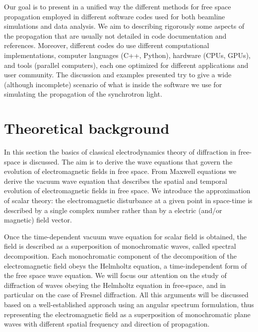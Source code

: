 \documentclass{iucr}              %
\begin{document}
Our goal is to present in a unified way the different methods for free space propagation employed in different software codes used for both beamline simulations and data analysis. We aim to describing rigorously some aspects of the propagation that are usually not detailed in code documentation and references. Moreover, different codes do use different computational implementations, computer languages (C++, Python), hardware (CPUs, GPUs), and tools (parallel computers), each one optimized for different applications and user community. The discussion and examples presented try to give a wide (although incomplete) scenario of what is inside the software we use for simulating the propagation of the synchrotron light.   

%

\section{Theoretical background}
\label{ch: theory}

In this section the basics of classical electrodynamics theory of diffraction in free-space is discussed. The aim is to derive the wave equations that govern the evolution of electromagnetic fields in free space. From Maxwell equations we derive the vacuum wave equation that describes the spatial and temporal evolution of electromagnetic fields in free space. We introduce the approximation of scalar theory: the electromagnetic disturbance at a given point in space-time is described by a single complex number rather than by a electric (and/or magnetic) field vector.

Once the time-dependent vacuum wave equation for scalar field is obtained, the field is described as a superposition of monochromatic waves, called spectral decomposition. Each monochromatic component of the decomposition of the electromagnetic field obeys the Helmholtz equation, a time-independent form of the free space wave equation. We will focus our attention on the study of diffraction of waves obeying the Helmholtz equation in free-space, and in particular on the case of Fresnel diffraction. All this arguments will be discussed based on a well-established approach \cite{paganin_book} using an angular spectrum formulation, thus representing the electromagnetic field as a superposition of monochromatic plane waves with different spatial frequency and direction of propagation. 
\end{document}
